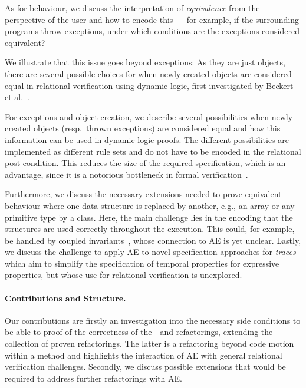 As for behaviour, we discuss the interpretation of \textit{equivalence} from the perspective of the user and how to encode this --- for example, if the surrounding programs throw exceptions, under which conditions are the exceptions considered equivalent?

We illustrate that this issue goes beyond exceptions:
As they are just objects, there are several possible choices for when newly created objects are considered equal in relational verification using dynamic logic, 
first investigated by Beckert et al.~\cite{DBLP:conf/lopstr/BeckertBKSSU13}.



For exceptions and object creation, we describe several possibilities when newly created objects (resp.\ thrown exceptions) are considered equal
and how this information can be used in dynamic logic proofs. The different possibilities are implemented as different rule sets and do not have to be encoded in the relational post-condition.
This reduces the size of the required specification, which is an advantage, since it is a notorious bottleneck in formal verification~\cite{DBLP:journals/corr/abs-1211-6186,DBLP:series/lncs/HahnleH19}.


Furthermore, we discuss the necessary extensions needed to prove equivalent behaviour where one data structure is replaced by another, e.g., an array or any primitive type by a class.
Here, the main challenge lies in the encoding that the structures are used correctly throughout the execution.
This could, for example, be handled by coupled invariants~\cite{DBLP:conf/birthday/BeckertU18}, whose connection to AE is yet unclear. 
Lastly, we discuss the challenge to apply AE to novel specification approaches for \emph{traces} which aim to simplify the specification of temporal properties for expressive properties, but whose use for relational verification is unexplored.

\paragraph{Contributions and Structure.}
Our contributions are firstly an investigation into the necessary side conditions to be able to proof of the correctness of the - and  refactorings, extending the collection of proven refactorings.
The latter is a refactoring beyond code motion within a method and highlights the interaction of AE with general relational verification challenges.
Secondly, we discuss possible extensions that would be required to address further refactorings with AE.

